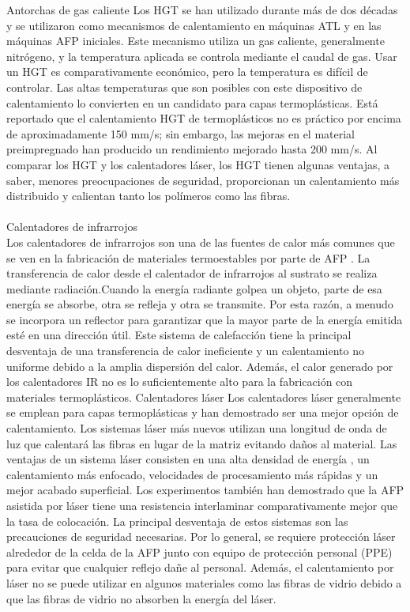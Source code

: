 Antorchas de gas caliente
Los HGT se han utilizado durante más de dos décadas y se utilizaron como mecanismos de calentamiento en máquinas ATL y en las máquinas AFP iniciales. Este mecanismo utiliza un gas caliente, generalmente nitrógeno, y la temperatura aplicada se controla mediante el caudal de gas. Usar un HGT es comparativamente económico, pero la temperatura es difícil de controlar. Las altas temperaturas que son posibles con este dispositivo de calentamiento lo convierten en un candidato para capas termoplásticas. Está reportado que el calentamiento HGT de termoplásticos no es práctico por encima de aproximadamente 150 mm/s; sin embargo, las mejoras en el material preimpregnado han producido un rendimiento mejorado hasta 200 mm/s. Al comparar los HGT y los calentadores láser, los HGT tienen algunas ventajas, a saber, menores preocupaciones de seguridad, proporcionan un calentamiento más distribuido y calientan tanto los polímeros como las fibras.\\\\
Calentadores de infrarrojos\\
Los calentadores de infrarrojos son una de las fuentes de calor más comunes que se ven en la fabricación de materiales termoestables por parte de AFP . La transferencia de calor desde el calentador de infrarrojos al sustrato se realiza mediante radiación.Cuando la energía radiante golpea un objeto, parte de esa energía se absorbe, otra se refleja y otra se transmite. Por esta razón, a menudo se incorpora un reflector para garantizar que la mayor parte de la energía emitida esté en una dirección útil. Este sistema de calefacción tiene la principal desventaja de una transferencia de calor ineficiente y un calentamiento no uniforme debido a la amplia dispersión del calor. Además, el calor generado por los calentadores IR no es lo suficientemente alto para la fabricación con materiales termoplásticos.
Calentadores láser
Los calentadores láser generalmente se emplean para capas termoplásticas y han demostrado ser una mejor opción de calentamiento. Los sistemas láser más nuevos utilizan una longitud de onda de luz que calentará las fibras en lugar de la matriz evitando daños al material. Las ventajas de un sistema láser consisten en una alta densidad de energía , un calentamiento más enfocado, velocidades de procesamiento más rápidas y un mejor acabado superficial. Los experimentos también han demostrado que la AFP asistida por láser tiene una resistencia interlaminar comparativamente mejor que la tasa de colocación. La principal desventaja de estos sistemas son las precauciones de seguridad necesarias. Por lo general, se requiere protección láser alrededor de la celda de la AFP junto con equipo de protección personal (PPE) para evitar que cualquier reflejo dañe al personal. Además, el calentamiento por láser no se puede utilizar en algunos materiales como las fibras de vidrio debido a que las fibras de vidrio no absorben la energía del láser.\\
